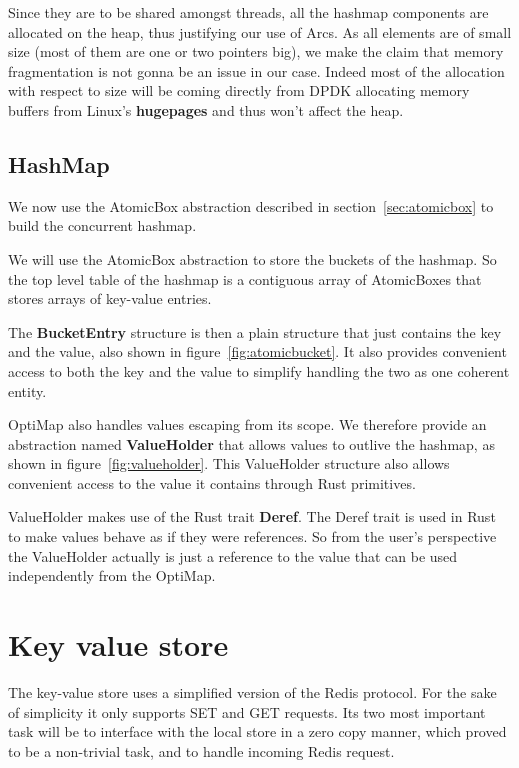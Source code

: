 Since they are to be shared amongst threads, all the hashmap
components are allocated on the heap, thus justifying our use of
Arcs. As all elements are of small size (most of them are one or two
pointers big), we make the claim that memory fragmentation is not
gonna be an issue in our case. Indeed most of the allocation with
respect to size will be coming directly from DPDK allocating memory
buffers from Linux's \textbf{hugepages} and thus won't affect the
heap.

\subsection{HashMap}

We now use the AtomicBox abstraction described in
section~\ref{sec:atomicbox} to build the concurrent hashmap.

We will use the AtomicBox abstraction to store the buckets of the
hashmap. So the top level table of the hashmap is a contiguous array
of AtomicBoxes that stores arrays of key-value entries.



The \textbf{BucketEntry} structure is then a plain structure that just
contains the key and the value, also shown in
figure~\ref{fig:atomicbucket}. It also provides convenient access to
both the key and the value to simplify handling the two as one
coherent entity.

OptiMap also handles values escaping from its scope. We therefore
provide an abstraction named \textbf{ValueHolder} that allows values to
outlive the hashmap, as shown in figure~\ref{fig:valueholder}. This
ValueHolder structure also allows convenient access to the value it
contains through Rust primitives.



ValueHolder makes use of the Rust trait \textbf{Deref}. The Deref
trait is used in Rust to make values behave as if they were
references. So from the user's perspective the ValueHolder actually is
just a reference to the value that can be used independently from the
OptiMap.

\section{Key value store}

The key-value store uses a simplified version of the Redis
protocol. For the sake of simplicity it only supports SET and GET
requests. Its two most important task will be to interface with the
local store in a zero copy manner, which proved to be a non-trivial
task, and to handle incoming Redis request.

